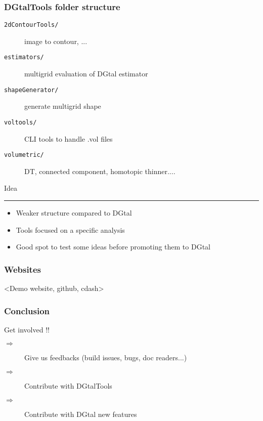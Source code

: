 \documentclass[8pt]{beamer}
\newcommand{\HH}{ \vspace{0.5pt}\hrule}
\begin{document}
\begin{frame}
  \frametitle{DGtalTools folder structure}

   \begin{description}
        \item[ \tt 2dContourTools/] image to contour, ...
        \item[ \tt estimators/] multigrid evaluation of  DGtal estimator
        \item[ \tt shapeGenerator/] generate multigrid shape
        \item[ \tt voltools/] CLI tools to handle .vol files
        \item[ \tt volumetric/] DT, connected component, homotopic thinner....
   \end{description}  

   \begin{block}{Idea\HH}
     \begin{itemize}
     \item Weaker  structure compared to DGtal
     \item Tools focused on a specific analysis
     \item Good spot to test some ideas before promoting them to DGtal
     \end{itemize}
     
   \end{block}

\end{frame}

\begin{frame}
  \frametitle{Websites}

<Demo website, github, cdash>
\end{frame}

\begin{frame}
  \frametitle{Conclusion}
  \begin{center}
    {\Huge \alert{Get involved !!}}
  \end{center}
\vspace{1cm}

  \begin{description}
    \item[$\Rightarrow$] Give us feedbacks (build issues, bugs, doc readers...)
    \item[$\Rightarrow$] Contribute with DGtalTools
    \item[$\Rightarrow$] Contribute with DGtal new features

  \end{description}


\end{frame}
\end{document}
